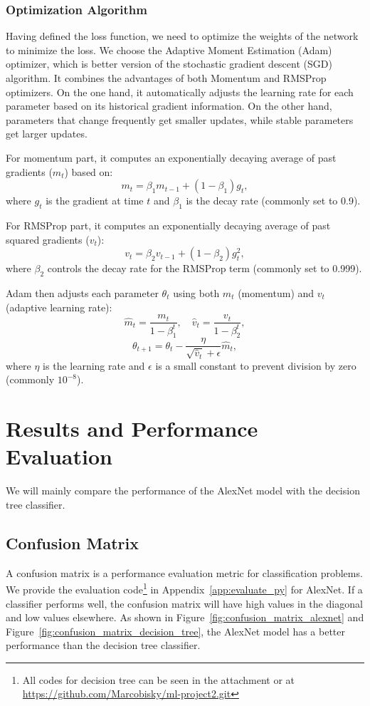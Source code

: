 \documentclass[a4paper,12pt]{article}
\begin{document}
\subsubsection{Optimization Algorithm}

Having defined the loss function, we need to optimize the weights of the network to minimize the loss. We choose the Adaptive Moment Estimation (Adam) optimizer, which is better version of the stochastic gradient descent (SGD) algorithm. It combines the advantages of both Momentum and RMSProp optimizers. On the one hand, it automatically adjusts the learning rate for each parameter based on its historical gradient information. On the other hand, parameters that change frequently get smaller updates, while stable parameters get larger updates.

For momentum part, it computes an exponentially decaying average of past gradients ($m_t$) based on:
$$
m_t = \beta_1 m_{t-1} + (1 - \beta_1) g_t,
$$
where $g_t$ is the gradient at time $t$ and $\beta_1$ is the decay rate (commonly set to 0.9).

For RMSProp part, it computes an exponentially decaying average of past squared gradients ($v_t$):
$$
v_t = \beta_2 v_{t-1} + (1 - \beta_2) g_t^2,
$$
where $\beta_2$ controls the decay rate for the RMSProp term (commonly set to 0.999).

Adam then adjusts each parameter $\theta_t$ using both $m_t$ (momentum) and $v_t$ (adaptive learning rate):
$$
\hat{m}_t = \frac{m_t}{1 - \beta_1^t}, \quad \hat{v}_t = \frac{v_t}{1 - \beta_2^t},
$$
$$
\theta_{t+1} = \theta_t - \frac{\eta}{\sqrt{\hat{v}_t} + \epsilon} \hat{m}_t,
$$
where $\eta$ is the learning rate and $\epsilon$ is a small constant to prevent division by zero (commonly $10^{-8}$).

\section{Results and Performance Evaluation}

We will mainly compare the performance of the AlexNet model with the decision tree classifier.

\subsection{Confusion Matrix}

A confusion matrix is a performance evaluation metric for classification problems. We provide the evaluation code\footnote{All codes for decision tree can be seen in the attachment or at \url{https://github.com/Marcobisky/ml-project2.git}} in Appendix~\ref{app:evaluate_py} for AlexNet. If a classifier performs well, the confusion matrix will have high values in the diagonal and low values elsewhere. As shown in Figure~\ref{fig:confusion_matrix_alexnet} and Figure~\ref{fig:confusion_matrix_decision_tree}, the AlexNet model has a better performance than the decision tree classifier.
\end{document}
